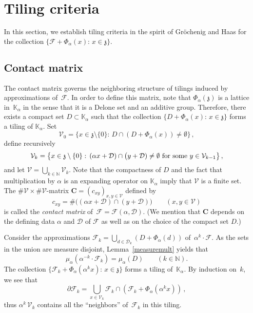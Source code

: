 \documentclass[12pt]{amsart}
\theoremstyle{definition}
\theoremstyle{remark}
\numberwithin{equation}{section}
\begin{document}
\section{Tiling criteria} \label{sec:tiling-criteria}

In this section, we establish tiling criteria in the spirit of Gr\"ochenig and Haas \cite [Theorem~4.8 and Proposition~5.3]{Groechenig-Haas:94} for the collection $\{\mathcal{F} + \Phi_\alpha(x):\, x \in \mathfrak{z}\}$.

\subsection*{Contact matrix}
The contact matrix governs the neighboring structure of tilings induced by approximations of~$\mathcal{F}$.
In order to define this matrix, note that $\Phi_\alpha(\mathfrak{z})$ is a lattice in~$\mathbb{K}_\alpha$ in the sense that it is a Delone set and an additive group.
Therefore, there exists a compact set $D \subset \mathbb{K}_\alpha$ such that the collection $\{D + \Phi_\alpha(x):\, x \in \mathfrak{z}\}$ forms a tiling of $\mathbb{K}_\alpha$.
Set
\[
\mathcal{V}_0 = \{x \in \mathfrak{z} \setminus \{0\}:\, D \cap (D + \Phi_\alpha(x)) \neq \emptyset\}\,,
\]
define recursively
\[
\mathcal{V}_k = \big\{x \in \mathfrak{z}\setminus\{0\}:\, (\alpha x + \mathcal{D}) \cap \big(y + \mathcal{D}) \neq \emptyset\ \hbox{for some}\ y \in \mathcal{V}_{k-1}\big\}\,,
\]
and let $\mathcal{V} = \bigcup_{k\in \mathbb{N}} \mathcal{V}_k$.
Note that the compactness of $D$ and the fact that multiplication by $\alpha$ is an expanding operator on $\mathbb{K}_\alpha$ imply that $\mathcal{V}$ is a finite set.
The $\#\mathcal{V} \times \#\mathcal{V}$-matrix $\mathbf{C} = (c_{x y})_{x,y \in\mathcal{V}}$ defined by
\[
c_{x y} = \#\big((\alpha x + \mathcal{D}) \cap (y + \mathcal{D})\big) \qquad (x, y \in \mathcal{V})
\]
is called the \emph{contact matrix} of~$\mathcal{F} = \mathcal{F}(\alpha,\mathcal{D})$. (We mention that $\mathbf{C}$ depends on the defining data $\alpha$ and $\mathcal{D}$ of $\mathcal{F}$ as well as on the choice of the compact set $D$.) 

Consider the approximations $\mathcal{F}_k = \bigcup_{d \in \mathcal{D}_k} (D+\Phi_\alpha(d))$ of~$\alpha^k \cdot \mathcal{F}$.
As the sets in the union are measure disjoint, Lemma~\ref{measuremult} yields that
\begin{equation}\label{measureequal}
\mu_\alpha(\alpha^{-k} \cdot \mathcal{F}_k) = \mu_\alpha(D) \qquad (k \in \mathbb{N}).
\end{equation}
The collection $\{\mathcal{F}_k + \Phi_\alpha(\alpha^k x):\, x \in \mathfrak{z}\}$ forms a tiling of~$\mathbb{K}_\alpha$.
By induction on~$k$, we see that
\begin{equation} \label{e:boundaryFk}
\partial \mathcal{F}_k = \bigcup_{x \in \mathcal{V}_k} \mathcal{F}_k \cap (\mathcal{F}_k + \Phi_\alpha(\alpha^k x))\,,
\end{equation}
thus $\alpha^k\, \mathcal{V}_k$ contains all the ``neighbors'' of~$\mathcal{F}_k$ in this tiling.
\end{document}
